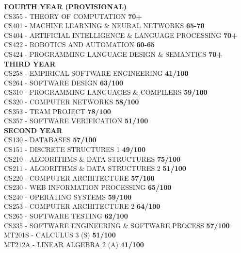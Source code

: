 
\textbf{FOURTH YEAR (PROVISIONAL)\\}
CS355 - THEORY OF COMPUTATION	\textbf{70+}\\
CS401 - MACHINE LEARNING \& NEURAL NETWORKS	\textbf{65-70}\\
CS404 - ARTIFICIAL INTELLIGENCE \& LANGUAGE PROCESSING	\textbf{70+}\\
CS422 - ROBOTICS AND AUTOMATION	\textbf{60-65}\\
CS424 - PROGRAMMING LANGUAGE DESIGN \& SEMANTICS	\textbf{70+}\\

\textbf{THIRD YEAR\\}
CS258 - EMPIRICAL SOFTWARE ENGINEERING \textbf{41/100} \\
CS264 - SOFTWARE DESIGN \textbf{63/100}\\
CS310 - PROGRAMMING LANGUAGES \& COMPILERS \textbf{59/100}\\
CS320 - COMPUTER NETWORKS \textbf{58/100}\\
CS353 - TEAM PROJECT \textbf{78/100}\\
CS357 - SOFTWARE VERIFICATION \textbf{51/100}\\

\textbf{SECOND YEAR\\}
CS130 - DATABASES                                \textbf{57/100}\\
CS151 - DISCRETE STRUCTURES 1                    \textbf{49/100}\\
CS210 - ALGORITHMS \& DATA STRUCTURES            \textbf{75/100}\\
CS211 - ALGORITHMS \& DATA STRUCTURES 2          \textbf{51/100}\\
CS220 - COMPUTER ARCHITECTURE                    \textbf{57/100} \\
CS230 - WEB INFORMATION PROCESSING               \textbf{65/100} \\
CS240 - OPERATING SYSTEMS                        \textbf{59/100}\\
CS253 - COMPUTER ARCHITECTURE 2                  \textbf{64/100}\\
CS265 - SOFTWARE TESTING                         \textbf{62/100}\\
CS335 - SOFTWARE ENGINEERING \& SOFTWARE PROCESS \textbf{57/100}\\
MT201S - CALCULUS 3 (S) \textbf{51/100}\\
MT212A - LINEAR ALGEBRA 2 (A)                    \textbf{41/100}\\

